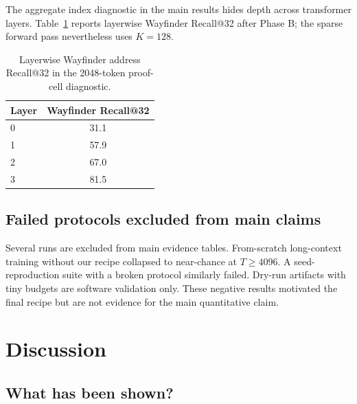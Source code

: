 \documentclass{article}
\begin{document}
The aggregate index diagnostic in the main results hides depth across transformer layers. Table~\ref{tab:layerwise} reports layerwise Wayfinder Recall@32 after Phase B; the sparse forward pass nevertheless uses $K=128$.

\begin{table}[H]
\caption{Layerwise Wayfinder address Recall@32 in the 2048-token proof-cell diagnostic.}
\centering
\small
\begin{tabular}{lc}
\toprule
Layer & Wayfinder Recall@32 \\
\midrule
0 & 31.1 \\
1 & 57.9 \\
2 & 67.0 \\
3 & 81.5 \\
\bottomrule
\end{tabular}
\label{tab:layerwise}
\end{table}

\subsection{Failed protocols excluded from main claims}

Several runs are excluded from main evidence tables. From-scratch long-context training without our recipe collapsed to near-chance at $T \ge 4096$. A seed-reproduction suite with a broken protocol similarly failed. Dry-run artifacts with tiny budgets are software validation only. These negative results motivated the final recipe but are not evidence for the main quantitative claim.

\section{Discussion}

\subsection{What has been shown?}
\end{document}
